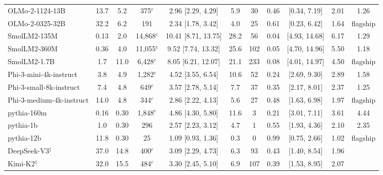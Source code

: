 \begin{table}[htbp]
\begin{threeparttable}
\begin{tabular}{@{}lcccccccccc@{}}
OLMo-2-1124-13B & 13.7 & 5.2 & 375$^{c}$ & 2.96 [2.29, 4.29] & 5.9 & 30 & 0.46 & [0.34, 7.19] & 2.01 & 1.26 \\
OLMo-2-0325-32B & 32.2 & 6.2 & 191 & 2.34 [1.78, 3.42] & 4.0 & 25 & 0.61 & [0.23, 6.42] & 1.64 & flagship \\
\addlinespace
SmolLM2-135M & 0.13 & 2.0 & 14,868$^{e}$ & 10.41 [8.71, 13.75] & 28.2 & 56 & 0.04 & [4.93, 14.68] & 6.17 & 1.29 \\
SmolLM2-360M & 0.36 & 4.0 & 11,055$^{e}$ & 9.52 [7.74, 13.32] & 25.6 & 102 & 0.05 & [4.70, 14.96] & 5.50 & 1.18 \\
SmolLM2-1.7B & 1.7 & 11.0 & 6,428$^{e}$ & 8.05 [6.21, 12.07] & 21.1 & 233 & 0.08 & [4.01, 14.97] & 4.50 & flagship \\
\addlinespace
Phi-3-mini-4k-instruct & 3.8 & 4.9 & 1,282$^{e}$ & 4.52 [3.55, 6.54] & 10.6 & 52 & 0.24 & [2.69, 9.30] & 2.89 & 1.58 \\
Phi-3-small-8k-instruct & 7.4 & 4.8 & 649$^{c}$ & 3.57 [2.78, 5.14] & 7.7 & 37 & 0.35 & [2.17, 8.01] & 2.37 & 1.25 \\
Phi-3-medium-4k-instruct & 14.0 & 4.8 & 344$^{c}$ & 2.86 [2.22, 4.13] & 5.6 & 27 & 0.48 & [1.63, 6.98] & 1.97 & flagship \\
\addlinespace
pythia-160m & 0.16 & 0.30 & 1,848$^{e}$ & 4.86 [4.30, 5.80] & 11.6 & 3 & 0.21 & [3.01, 7.11] & 3.61 & 4.44 \\
pythia-1b & 1.0 & 0.30 & 296 & 2.57 [2.23, 3.12] & 4.7 & 1 & 0.55 & [1.93, 4.36] & 2.10 & 2.35 \\
pythia-12b & 11.8 & 0.30 & 25 & 1.09 [0.93, 1.36] & 0.3 & 0 & 0.99 & [0.75, 2.66] & 1.02 & flagship \\
\addlinespace
DeepSeek-V3$^{\ddagger}$ & 37.0 & 14.8 & 400$^{c}$ & 3.09 [2.29, 4.73] & 6.3 & 93 & 0.43 & [1.40, 8.54] & 1.96 &  \\
\addlinespace
Kimi-K2$^{\ddagger}$ & 32.0 & 15.5 & 484$^{c}$ & 3.30 [2.45, 5.10] & 6.9 & 107 & 0.39 & [1.53, 8.95] & 2.07 &  \\
\bottomrule
\end{tabular}
\begin{tablenotes}\footnotesize

\end{tablenotes}
\end{threeparttable}
\end{table}
